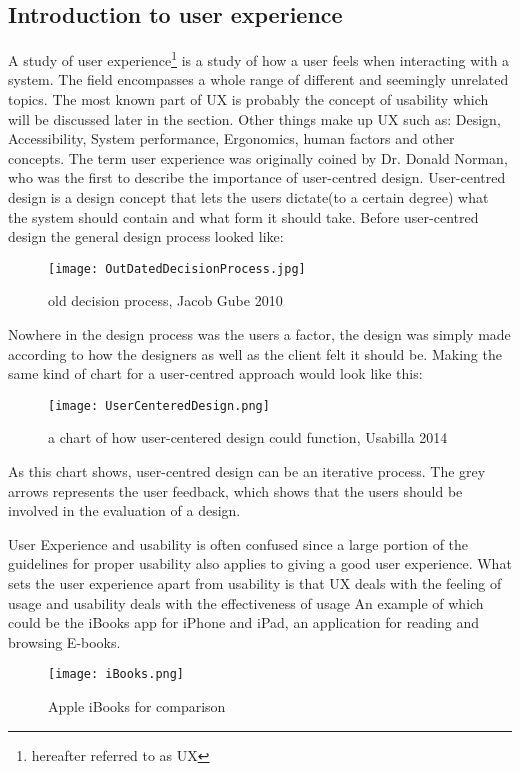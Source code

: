 \subsection{Introduction to user experience }\label{UXIntro}
A study of user experience\footnote{hereafter referred to as UX} is a study of how a user feels when interacting with a system. The field encompasses a whole range of different and seemingly unrelated topics. The most known part of UX is probably the concept of usability which will be discussed later in the section. Other things make up UX such as: Design, Accessibility, System performance, Ergonomics, human factors and other concepts\cite{UXIntro}. The term user 
experience  was originally coined by Dr. Donald Norman, who was the first to describe the importance of user-centred design. User-centred design is a design 
concept that lets the users dictate(to a certain degree) what the system should contain and what form it should take. Before user-centred design the general design process looked like:
\begin{figure}[H]
\centering
\texttt{[image: OutDatedDecisionProcess.jpg]}
\caption{old decision process, Jacob Gube 2010}
\end{figure}
Nowhere in the design process was the users a factor, the design was simply made according to how the designers as well as the client felt it should be. Making the same kind of chart for a user-centred approach would look like this:\\
\begin{figure}[H]
\centering
\texttt{[image: UserCenteredDesign.png]}
\caption{a chart of how user-centered design could function, Usabilla 2014}
\label{UXUserCentred}
\end{figure}
As this chart shows, user-centred design can be an iterative process. The grey arrows represents the user feedback, which shows that the users should be involved 
in the evaluation of a design.

User Experience and usability is often confused since a large portion of the guidelines for proper usability also applies to giving a good user experience. 
What sets the user experience apart from usability is that UX deals with the feeling of usage and usability deals with the effectiveness of usage
An example of which could be the iBooks app for iPhone and iPad, an application for reading and browsing E-books.
\begin{figure}[H]
\centering
\texttt{[image: iBooks.png]}
\caption{Apple iBooks for comparison}
\end{figure}

